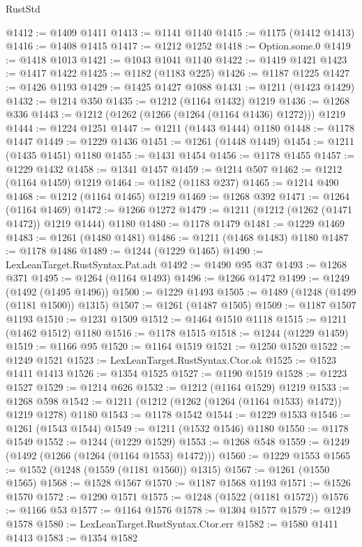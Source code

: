 \begin{lexlean}{RustStd}
\begin{coremodule}
{\begin{coremodule}
{{{{{{{{{{{{{{{{{{{{{{{{{{{{{{{{@1412 := @1409 @1411
@1413 := @1141 @1140
@1415 := @1175 (@1412 @1413)
@1416 := @1408 @1415
@1417 := @1212 @1252
@1418 := Option.some.{0}
@1419 := @1418 @1013
@1421 := @1043 @1041 @1140
@1422 := @1419 @1421
@1423 := @1417 @1422
@1425 := @1182 (@1183 @225)
@1426 := @1187 @1225
@1427 := @1426 @1193
@1429 := @1425 @1427 @1088
@1431 := @1211 (@1423 @1429)
@1432 := @1214 @350
@1435 := @1212 (@1164 @1432) @1219
@1436 := @1268 @336
@1443 := @1212 (@1262 (@1266 (@1264 (@1164 @1436) @1272))) @1219
@1444 := @1224 @1251
@1447 := @1211 (@1443 @1444) @1180
@1448 := @1178 @1447
@1449 := @1229 @1436
@1451 := @1261 (@1448 @1449)
@1454 := @1211 (@1435 @1451) @1180
@1455 := @1431 @1454
@1456 := @1178 @1455
@1457 := @1229 @1432
@1458 := @1341 @1457
@1459 := @1214 @507
@1462 := @1212 (@1164 @1459) @1219
@1464 := @1182 (@1183 @237)
@1465 := @1214 @490
@1468 := @1212 (@1164 @1465) @1219
@1469 := @1268 @392
@1471 := @1264 (@1164 @1469)
@1472 := @1266 @1272
@1479 := @1211 (@1212 (@1262 (@1471 @1472)) @1219 @1444) @1180
@1480 := @1178 @1479
@1481 := @1229 @1469
@1483 := @1261 (@1480 @1481)
@1486 := @1211 (@1468 @1483) @1180
@1487 := @1178 @1486
@1489 := @1244 (@1229 @1465)
@1490 := LexLeanTarget.RustSyntax.Pat.adt
@1492 := @1490 @95 @37
@1493 := @1268 @371
@1495 := @1264 (@1164 @1493)
@1496 := @1266 @1472
@1499 := @1249 (@1492 (@1495 @1496))
@1500 := @1229 @1493
@1505 := @1489 (@1248 (@1499 (@1181 @1500)) @1315)
@1507 := @1261 (@1487 @1505)
@1509 := @1187 @1507 @1193
@1510 := @1231 @1509
@1512 := @1464 @1510 @1118
@1515 := @1211 (@1462 @1512) @1180
@1516 := @1178 @1515
@1518 := @1244 (@1229 @1459)
@1519 := @1166 @95
@1520 := @1164 @1519
@1521 := @1250 @1520
@1522 := @1249 @1521
@1523 := LexLeanTarget.RustSyntax.Ctor.ok
@1525 := @1523 @1411 @1413
@1526 := @1354 @1525
@1527 := @1190 @1519
@1528 := @1223 @1527
@1529 := @1214 @626
@1532 := @1212 (@1164 @1529) @1219
@1533 := @1268 @598
@1542 := @1211 (@1212 (@1262 (@1264 (@1164 @1533) @1472)) @1219 @1278) @1180
@1543 := @1178 @1542
@1544 := @1229 @1533
@1546 := @1261 (@1543 @1544)
@1549 := @1211 (@1532 @1546) @1180
@1550 := @1178 @1549
@1552 := @1244 (@1229 @1529)
@1553 := @1268 @548
@1559 := @1249 (@1492 (@1266 (@1264 (@1164 @1553) @1472)))
@1560 := @1229 @1553
@1565 := @1552 (@1248 (@1559 (@1181 @1560)) @1315)
@1567 := @1261 (@1550 @1565)
@1568 := @1528 @1567
@1570 := @1187 @1568 @1193
@1571 := @1526 @1570
@1572 := @1290 @1571
@1575 := @1248 (@1522 (@1181 @1572))
@1576 := @1166 @53
@1577 := @1164 @1576
@1578 := @1304 @1577
@1579 := @1249 @1578
@1580 := LexLeanTarget.RustSyntax.Ctor.err
@1582 := @1580 @1411 @1413
@1583 := @1354 @1582
}}}}}}}}}}}}}}}}}}}}}}}}}}}}}}}}
\end{coremodule}}
\end{coremodule}
\end{lexlean}
